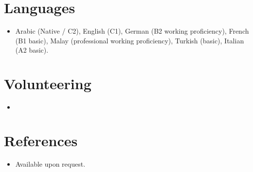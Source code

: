 \documentclass[11pt,a4paper,sans]{moderncv}
\begin{document}
\section{Languages}
\vspace{1pt}
\begin{itemize}
\item {Arabic (Native / C2), English (C1), German (B2 working proficiency), French (B1 basic), Malay (professional working proficiency), Turkish (basic), Italian (A2 basic).}
\end{itemize}

\section{Volunteering}
\vspace{1pt}
\begin{itemize}
\item{}
\end{itemize}

\section{References}
\vspace{1pt}
\begin{itemize}
\item{Available upon request.}
\end{itemize}
\end{document}
